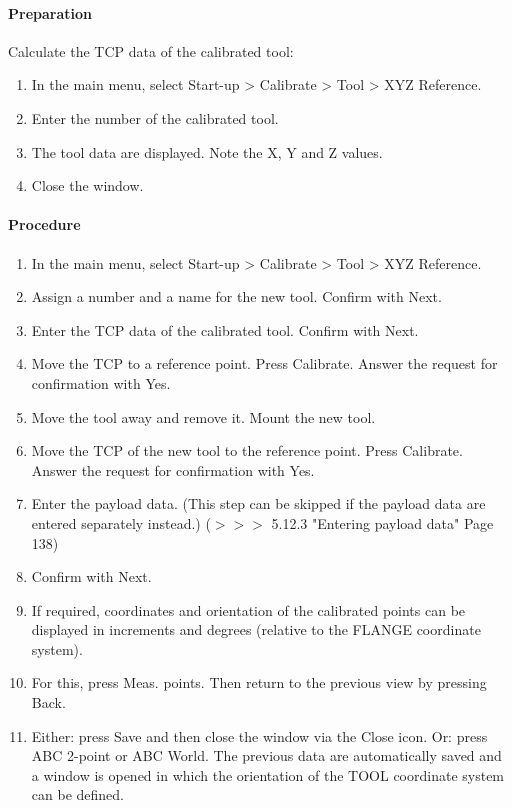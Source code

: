 \paragraph{Preparation}
Calculate the TCP data of the calibrated tool:
\begin{enumerate}
	\item In the main menu, select Start-up > Calibrate > Tool > XYZ Reference.
	\item Enter the number of the calibrated tool.
	\item The tool data are displayed. Note the X, Y and Z values.
	\item Close the window.
\end{enumerate}
\paragraph{Procedure}
\begin{enumerate}
	\item In the main menu, select Start-up > Calibrate > Tool > XYZ Reference.
	\item Assign a number and a name for the new tool. Confirm with Next.
	\item Enter the TCP data of the calibrated tool. Confirm with Next.
	\item Move the TCP to a reference point. Press Calibrate. Answer the request for confirmation with Yes. 
	\item Move the tool away and remove it. Mount the new tool.
	\item Move the TCP of the new tool to the reference point. Press Calibrate. Answer the request for confirmation with Yes.
	\item Enter the payload data. (This step can be skipped if the payload data are entered separately instead.)
		($>>>$ 5.12.3 "Entering payload data" Page 138)
	\item Confirm with Next.
	\item If required, coordinates and orientation of the calibrated points can be displayed in increments and degrees (relative to the FLANGE coordinate system).
	\item For this, press Meas. points. Then return to the previous view by pressing Back.
	\item Either: press Save and then close the window via the Close icon.
	Or: press ABC 2-point or ABC World. The previous data are automatically saved and a window is opened in which the orientation of the TOOL coordinate system can be defined.
\end{enumerate}

